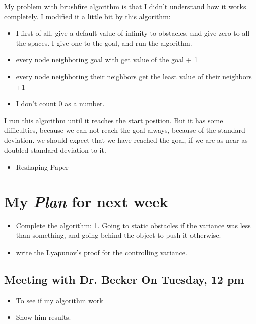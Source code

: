 My problem with brushfire algorithm is that I didn't understand how it works completely. I modified it a little bit by this algorithm:
\begin{itemize}
\item I first of all, give a default value of infinity to obstacles, and give zero to all the spaces. I give one to the goal, and run the algorithm.
\item every node neighboring goal with get value of the goal + 1
\item every node neighboring their neighbors get the least value of their neighbors +1
\item I don't count 0 as a number.
\end{itemize}
I run this algorithm until it reaches the start position.
But it has some difficulties, because we can not reach the goal always, because of the standard deviation. we should expect that we have reached the goal, if we are as near as doubled standard deviation to it.

\begin{itemize}
\item Reshaping Paper
\end{itemize}




\section{My \emph{Plan} for next week}

\begin{itemize}
\item Complete the algorithm: 1. Going to static obstacles if the variance was less than something, and going behind the object to push it otherwise. 
\item write the Lyapunov's proof for the controlling variance.
\end{itemize}

\subsection{Meeting with Dr. Becker On Tuesday, 12 pm }

\begin{itemize}
\item To see if my algorithm work

\item Show him results.
\end{itemize}



